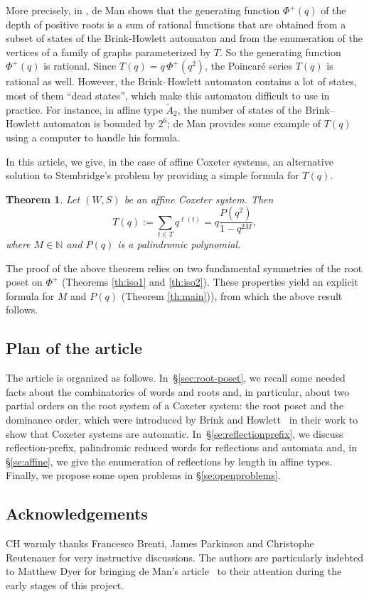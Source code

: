 \documentclass{amsart}
\newtheorem{Theorem}{Theorem}[section]
\theoremstyle{definition}
\begin{document}
More precisely, in \cite[Theorem 4.1]{DM}, de Man shows that the generating function  $\Phi^+(q)$ of the depth of positive roots is a sum of rational functions that are obtained from a subset of states of the Brink-Howlett automaton and from the enumeration of the vertices of a family of graphs parameterized by $T$. So the generating function $\Phi^+(q)$ is rational. Since $T(q)=q\, \Phi^+(q^2)$, the Poincar\'e series $T(q)$  is rational as well. However, the Brink--Howlett automaton contains a lot of states, most of them ``dead states'', which make this automaton difficult to use in practice. For instance, in affine type $\widetilde{A}_2$, the number of states of the Brink--Howlett automaton is bounded by $2^6$; de Man provides some example of $T(q)$ using a computer to handle his formula.  
 
 In this article, we give, in the case of affine Coxeter systems, an alternative solution to Stembridge's problem by providing a simple formula for  $T(q)$. 

\begin{Theorem}\label{thm:Main1} Let $(W,S)$ be an affine Coxeter system. Then 
$$
T(q):=\sum_{t\in T}q^{\ell(t)}=q\frac{P(q^2)}{1-q^{2M}},
$$ 
where $M\in \mathbb{N}$ and $P(q)$ is a palindromic polynomial.
\end{Theorem}

The proof of the above theorem relies on two fundamental symmetries of the root poset on $\Phi^+$ (Theorems \ref{th:iso1} and \ref{th:iso2}). These properties yield an explicit formula for $M$ and $P(q)$ (Theorem \ref{th:main})), from which the above result follows.

\subsection*{Plan of the article} The article is organized as follows. In~\S\ref{sec:root-poset}, we recall some needed facts about the combinatorics of words and roots and, in particular, about two partial orders on the root system of a Coxeter system: the root poset and the dominance order, which were introduced by Brink and Howlett~\cite{BH} in their work to show that Coxeter systems are automatic. In~\S\ref{se:reflectionprefix}, we discuss reflection-prefix, palindromic reduced words for reflections and automata and, in \S\ref{se:affine},  we give the enumeration of reflections by length in affine types. Finally, we propose some open problems in \S\ref{se:openproblems}.

\subsection*{Acknowledgements}  CH warmly thanks Francesco Brenti, James Parkinson and Christophe Reutenauer for very instructive discussions. 
The authors are particularly indebted to Matthew Dyer for bringing de Man’s article~\cite{DM} to their attention during the early stages of this project.
\end{document}
